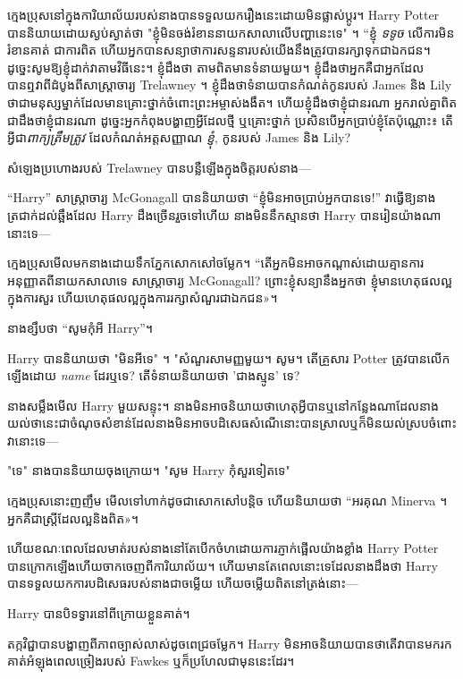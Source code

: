 {ក្មេងប្រុសនៅក្នុងការិយាល័យរបស់នាងបានទទួលយករឿងនេះដោយមិនផ្លាស់ប្តូរ។ Harry Potter បាននិយាយដោយស្ងប់ស្ងាត់ថា "ខ្ញុំមិនចង់រំខាននាយកសាលាលើបញ្ហានេះទេ" ។ “ខ្ញុំ \emph{ទទូច} លើការមិនរំខានគាត់ ជាការពិត ហើយអ្នកបានសន្យាថាការសន្ទនារបស់យើងនឹងត្រូវបានរក្សាទុកជាឯកជន។ ដូច្នេះសូមឱ្យខ្ញុំដាក់វាតាមវិធីនេះ។ ខ្ញុំដឹងថា តាមពិតមានទំនាយមួយ។ ខ្ញុំដឹងថាអ្នកគឺជាអ្នកដែលបានឮវាពីដំបូងពីសាស្រ្តាចារ្យ Trelawney ។ ខ្ញុំដឹងថាទំនាយបានកំណត់កូនរបស់ James និង Lily ថាជាមនុស្សម្នាក់ដែលមានគ្រោះថ្នាក់ចំពោះព្រះអម្ចាស់ងងឹត។ ហើយខ្ញុំដឹងថាខ្ញុំជានរណា អ្នករាល់គ្នាពិតជាដឹងថាខ្ញុំជានរណា ដូច្នេះអ្នកកំពុងបង្ហាញអ្វីដែលថ្មី ឬគ្រោះថ្នាក់ ប្រសិនបើអ្នកប្រាប់ខ្ញុំតែប៉ុណ្ណោះ៖ តើអ្វីជា\emph{ពាក្យត្រឹមត្រូវ} ដែលកំណត់អត្តសញ្ញាណ \emph{ខ្ញុំ}, កូនរបស់ James និង Lily?

សំឡេងប្រហោងរបស់ Trelawney បានបន្លឺឡើងក្នុងចិត្តរបស់នាង—


“Harry” សាស្ត្រាចារ្យ McGonagall បាននិយាយថា “ខ្ញុំមិនអាចប្រាប់អ្នកបានទេ!” វាធ្វើឱ្យនាងត្រជាក់ដល់ឆ្អឹងដែល Harry ដឹងច្រើនរួចទៅហើយ នាងមិននឹកស្មានថា Harry បានរៀនយ៉ាងណានោះទេ—

ក្មេង​ប្រុស​មើល​មក​នាង​ដោយ​ទឹក​ភ្នែក​សោកសៅ​ចម្លែក។ “តើ​អ្នក​មិន​អាច​កណ្តាស់​ដោយ​គ្មាន​ការ​អនុញ្ញាត​ពី​នាយក​សាលា​ទេ សាស្ត្រាចារ្យ McGonagall? ព្រោះ​ខ្ញុំ​សន្យា​នឹង​អ្នក​ថា ខ្ញុំ​មាន​ហេតុផល​ល្អ​ក្នុង​ការ​សួរ ហើយ​ហេតុផល​ល្អ​ក្នុង​ការ​រក្សា​សំណួរ​ជា​ឯកជន»។

នាង​ខ្សឹប​ថា “សូម​កុំ​អី Harry”។

Harry បាននិយាយថា "មិនអីទេ" ។ "សំណួរសាមញ្ញមួយ។ សូម។ តើគ្រួសារ Potter ត្រូវបានលើកឡើងដោយ \emph{name} ដែរឬទេ? តើទំនាយនិយាយថា 'ជាងស្មូន' ទេ?

នាងសម្លឹងមើល Harry មួយសន្ទុះ។ នាង​មិន​អាច​និយាយ​ថា​ហេតុ​អ្វី​បាន​ឬ​នៅ​កន្លែង​ណា​ដែល​នាង​យល់​ថា​នេះ​ជា​ចំណុច​សំខាន់​ដែល​នាង​មិន​អាច​បដិសេធ​សំណើ​នោះ​បាន​ស្រាល​ឬ​ក៏​មិន​យល់​ស្រប​ចំពោះ​វា​នោះ​ទេ—

"ទេ" នាងបាននិយាយចុងក្រោយ។ "សូម Harry កុំសួរទៀតទេ"

ក្មេងប្រុសនោះញញឹម មើលទៅហាក់ដូចជាសោកសៅបន្តិច ហើយនិយាយថា “អរគុណ Minerva ។ អ្នក​គឺ​ជា​ស្ត្រី​ដែល​ល្អ​និង​ពិត​»។ %

ហើយខណៈពេលដែលមាត់របស់នាងនៅតែបើកចំហដោយការភ្ញាក់ផ្អើលយ៉ាងខ្លាំង Harry Potter បានក្រោកឡើងហើយចាកចេញពីការិយាល័យ។ ហើយមានតែពេលនោះទេដែលនាងដឹងថា Harry បានទទួលយកការបដិសេធរបស់នាងជាចម្លើយ ហើយចម្លើយពិតនៅត្រង់នោះ—

Harry បានបិទទ្វារនៅពីក្រោយខ្លួនគាត់។

តក្កវិជ្ជាបានបង្ហាញពីភាពច្បាស់លាស់ដូចពេជ្រចម្លែក។ Harry មិន​អាច​និយាយ​បាន​ថា​តើ​វា​បាន​មក​រក​គាត់​អំឡុង​ពេល​ច្រៀង​របស់ Fawkes ឬ​ក៏​ប្រហែល​ជា​មុន​នេះ​ដែរ។

}
